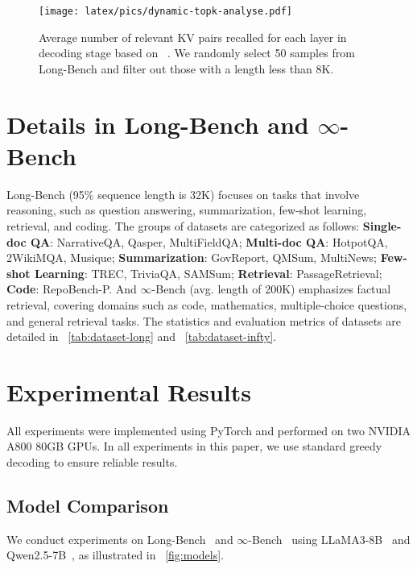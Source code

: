\begin{figure*}[!ht] 
    \centering
        \texttt{[image: latex/pics/dynamic-topk-analyse.pdf]}
    \caption{Average number of relevant KV pairs recalled for each  layer in decoding stage based on \basellama~\cite{llama3}. We
randomly select 50 samples from Long-Bench and filter out those with a length less than 8K. } 
    \label{fig:recall}
\end{figure*}
\section{Details in Long-Bench and $\infty$-Bench}
\label{sec:alg}
Long-Bench (95\% sequence length is 32K) focuses on tasks that involve reasoning, such as question answering, summarization, few-shot learning, retrieval, and coding.  The groups of datasets are categorized as follows: \textbf{Single-doc QA}: NarrativeQA, Qasper, MultiFieldQA; \textbf{Multi-doc QA}: HotpotQA, 2WikiMQA, Musique; \textbf{Summarization}: GovReport, QMSum, MultiNews; \textbf{Few-shot Learning}: TREC, TriviaQA, SAMSum; \textbf{Retrieval}: PassageRetrieval; \textbf{Code}: RepoBench-P. And $\infty$-Bench (avg. length of 200K) emphasizes factual retrieval, covering domains such as code, mathematics, multiple-choice questions, and general retrieval tasks. The statistics and evaluation metrics of datasets are detailed in ~\cref{tab:dataset-long} and ~\cref{tab:dataset-infty}.


\section{Experimental Results}
\label{sec:experiments}
All experiments were implemented using PyTorch and performed on two NVIDIA A800 80GB GPUs. In all experiments in this paper, we use standard greedy decoding to ensure reliable results.

\subsection{Model Comparison}
We conduct experiments on Long-Bench~\cite{longbench} and $\infty$-Bench~\cite{infinitebench} using LLaMA3-8B~\cite{llama3} and Qwen2.5-7B~\cite{qwen2.5}, as illustrated in ~\cref{fig:models}. 


